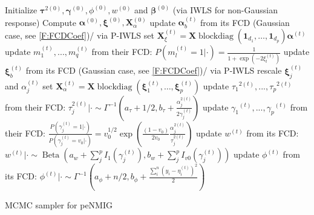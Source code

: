 \documentclass[article, shortnames, nojss, noheadings, notitle]{jss}
\begin{document}
\begin{algorithm}[!h]
\begin{algorithmic}
\STATE Initialize $\bm\tau^{2(0)}, \bm\gamma^{(0)},
\phi^{(0)}, w^{(0)}$ and $\bm\beta^{(0)}$ (via IWLS for
non-Gaussian response) \STATE
Compute $\bm\alpha^{(0)}, \bm\xi^{(0)}, \bm X^{(0)}_{\alpha}$
        \STATE update $\bm\alpha^{(t)}_b$ from its FCD (Gaussian case, see \eqref{F:FCDCoef})/ via P-IWLS
    \ENDFOR
    \STATE set $\bm X^{(t)}_\xi = \bm X \operatorname{blockdiag}(\bm 1_{d_1},\dots,\bm 1_{d_p})\bm\alpha^{(t)}$
    \STATE update $m^{(t)}_1,...,m^{(t)}_q$ from their FCD: $P(m^{(t)}_l=1|\cdot)=\tfrac{1}{1+\exp(-2\xi^{(t)}_l)}$
        \STATE update $\bm\xi^{(t)}_b$ from its FCD (Gaussian case, see \eqref{F:FCDCoef})/ via P-IWLS
    \ENDFOR
        \STATE rescale $\bm\xi^{(t)}_j$ and $\alpha^{(t)}_j$
    \ENDFOR
    \STATE set $\bm X^{(t)}_\alpha = \bm X \operatorname{blockdiag}(\bm\xi^{(t)}_1,\dots,\bm\xi^{(t)}_p)$
    \STATE update ${\tau_1}^{2(t)},...,{\tau_p}^{2(t)}$ from their FCD:
    $\tau^{2(t)}_j|\cdot \sim \Gamma^{-1}\left(a_\tau+ 1/2,  b_\tau + \frac{\alpha_{j}^{2(t)}}{2\gamma^{(t)}_j}\right)$
    \STATE update ${\gamma_1}^{(t)},...,{\gamma_p}^{(t)}$ from their FCD:
    $\frac{P(\gamma^{(t)}_j=1|\cdot)}{P(\gamma^{(t)}_j=v_0|\cdot)} =  v_0^{1/2} \exp\left(\frac{(1-v_0)}{2v_0}\frac{\alpha_{j}^{2(t)}}{\tau^{2(t)}_j}\right)$
    \STATE update $w^{(t)}$ from its FCD:
    $w^{(t)}|\cdot \sim \operatorname{Beta}\left(a_w + \sum_j^p I_1(\gamma^{(t)}_j),  b_w + \sum_j^p I_{v0}(\gamma^{(t)}_j)\right)$
     \STATE update ${\phi}^{(t)}$ from its FCD:
    $\phi^{(t)}|\cdot \sim  \Gamma^{-1}\left(a_\phi + n/2,  b_\phi + \frac{\sum^n_i(y_i-\eta^{(t)}_i)^2}{2}\right) $ \ENDIF
\ENDFOR
\end{algorithmic}
\caption{MCMC sampler for peNMIG} \label{MCMCalgFCD}
\end{algorithm}
\end{document}
